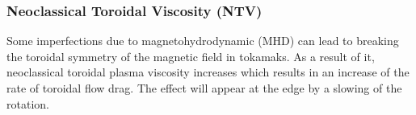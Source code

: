 \documentclass[12pt,lot, lof]{puthesis}
\begin{document}
%



\subsubsection{Neoclassical Toroidal Viscosity (NTV)}
 \label{TNTV}

Some imperfections due to magnetohydrodynamic (MHD) can lead to breaking the toroidal symmetry of the magnetic field in tokamaks. As a result of it, neoclassical toroidal plasma viscosity increases which results in  an increase of the rate of toroidal flow drag. The effect will appear at the edge by a slowing of the rotation.
\end{document}
